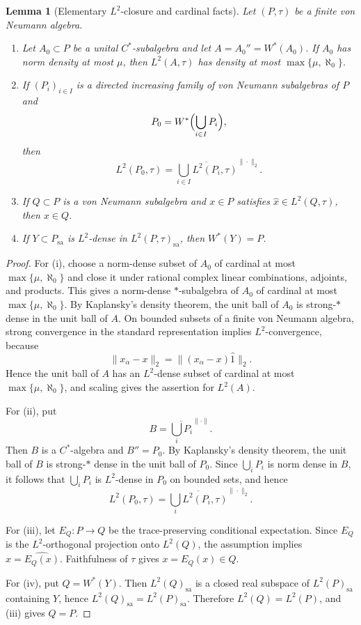 \documentclass[11pt,letterpaper,reqno]{amsart}
\newtheorem{lem}[thm]{Lemma}
\theoremstyle{definition}
\numberwithin{equation}{section}
\newcommand{\sa}{\mathrm{sa}}
\begin{document}
\begin{lem}[Elementary $L^2$-closure and cardinal facts]\label{lem:l2-cardinal-facts}
Let $(P,\tau)$ be a finite von Neumann algebra.

\begin{enumerate}[label=(\roman*)]
\item Let $A_0\subset P$ be a unital $C^*$-subalgebra and let
      $A=A_0''=W^*(A_0)$.  If $A_0$ has norm density at most $\mu$, then
      $L^2(A,\tau)$ has density at most $\max\{\mu,\aleph_0\}$.

\item If $(P_i)_{i\in I}$ is a directed increasing family of von Neumann
      subalgebras of $P$ and
      \[
         P_0=W^*\Bigl(\bigcup_{i\in I}P_i\Bigr),
      \]
      then
      \[
         L^2(P_0,\tau)=
         \overline{\bigcup_{i\in I}L^2(P_i,\tau)}^{\|\cdot\|_2}.
      \]

\item If $Q\subset P$ is a von Neumann subalgebra and $x\in P$ satisfies
      $\widehat{x}\in L^2(Q,\tau)$, then $x\in Q$.

\item If $Y\subset P_{\sa}$ is $L^2$-dense in $L^2(P,\tau)_{\sa}$, then
      $W^*(Y)=P$.
\end{enumerate}
\end{lem}

\begin{proof}
For (i), choose a norm-dense subset of $A_0$ of cardinal at most
$\max\{\mu,\aleph_0\}$ and close it under rational complex linear
combinations, adjoints, and products.  This gives a norm-dense $*$-subalgebra
of $A_0$ of cardinal at most $\max\{\mu,\aleph_0\}$.  By Kaplansky's density
theorem, the unit ball of $A_0$ is strong-$*$ dense in the unit ball of $A$.
On bounded subsets of a finite von Neumann algebra, strong convergence in the
standard representation implies $L^2$-convergence, because
\[
   \|x_\alpha-x\|_2=\|(x_\alpha-x)\widehat{1}\|_2 .
\]
Hence the unit ball of $A$ has an $L^2$-dense subset of cardinal at most
$\max\{\mu,\aleph_0\}$, and scaling gives the assertion for $L^2(A)$.

For (ii), put
\[
   B=\overline{\bigcup_iP_i}^{\|\cdot\|}.
\]
Then \(B\) is a \(C^*\)-algebra and \(B''=P_0\).  By Kaplansky's density
theorem, the unit ball of \(B\) is strong-\(*\) dense in the unit ball of
\(P_0\).  Since \(\bigcup_iP_i\) is norm dense in \(B\), it follows that
\(\bigcup_iP_i\) is \(L^2\)-dense in \(P_0\) on bounded sets, and hence
\[
   L^2(P_0,\tau)=
   \overline{\bigcup_iL^2(P_i,\tau)}^{\|\cdot\|_2}.
\]

For (iii), let $E_Q:P\to Q$ be the trace-preserving conditional expectation.
Since $E_Q$ is the $L^2$-orthogonal projection onto $L^2(Q)$, the assumption
implies $\widehat{x}=\widehat{E_Q(x)}$.  Faithfulness of $\tau$ gives
$x=E_Q(x)\in Q$.

For (iv), put $Q=W^*(Y)$.  Then $L^2(Q)_{\sa}$ is a closed real subspace of
$L^2(P)_{\sa}$ containing $Y$, hence $L^2(Q)_{\sa}=L^2(P)_{\sa}$.  Therefore
$L^2(Q)=L^2(P)$, and (iii) gives $Q=P$.
\end{proof}
\end{document}
